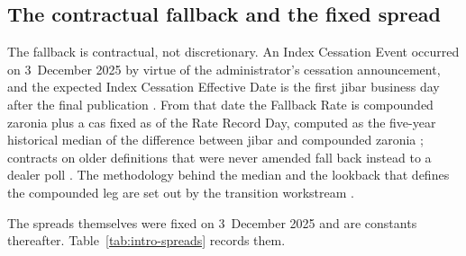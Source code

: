 \documentclass[../../../main.tex]{subfiles}
\begin{document}

\subsection{The contractual fallback and the fixed spread}

The fallback is contractual, not discretionary. An Index Cessation Event occurred on 3~December 2025 by virtue of the administrator's cessation announcement, and the expected Index Cessation Effective Date is the first \gls{jibar} business day after the final publication \citep[\S1.1]{isda2025}. From that date the Fallback Rate is compounded \gls{zaronia} plus a \gls{cas} fixed as of the Rate Record Day, computed as the five-year historical median of the difference between \gls{jibar} and compounded \gls{zaronia} \citep[Sects.~2--4]{isda2025}; contracts on older definitions that were never amended fall back instead to a dealer poll \citep[\S5]{isda2025}. The methodology behind the median and the lookback that defines the compounded leg are set out by the transition workstream \citep[\S1, p.~3; \S4.1, p.~7; \S6, p.~14]{sarb2025fallback}.

The spreads themselves were fixed on 3~December 2025 and are constants thereafter. Table~\ref{tab:intro-spreads} records them.
\end{document}
